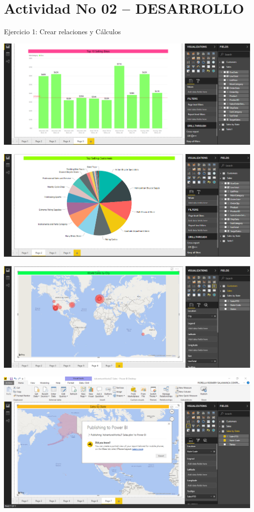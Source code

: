 \section{Actividad No 02 – DESARROLLO} 

Ejercicio 1: Crear relaciones y Cálculos \\

	\begin{center}
	\includegraphics[width=15cm]{./Imagenes/21.png}
	\end{center}	
	\begin{center}
	\includegraphics[width=15cm]{./Imagenes/22.png}
	\end{center}	
\begin{center}
	\includegraphics[width=15cm]{./Imagenes/23.png}
	\end{center}	
\begin{center}
	\includegraphics[width=15cm]{./Imagenes/24.png}
	\end{center}	
